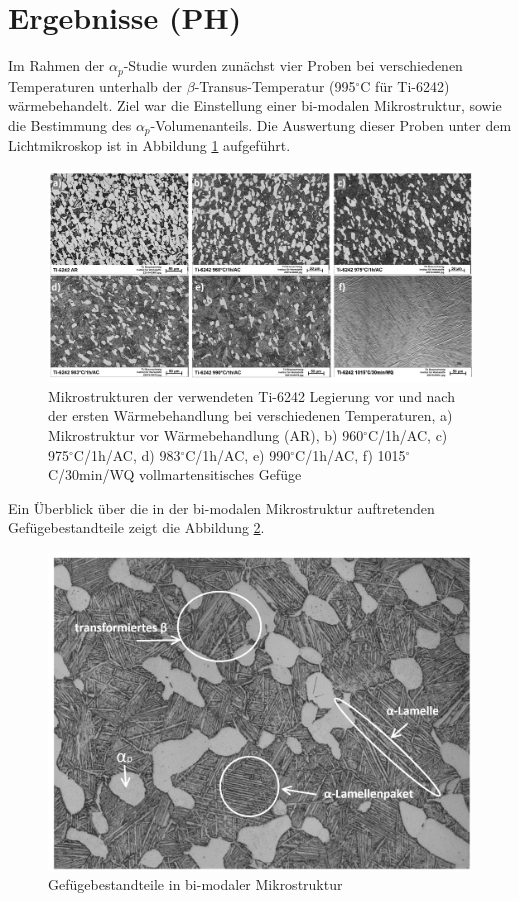 \section{Ergebnisse (PH)}

Im Rahmen der $\alpha_p$-Studie wurden zunächst vier Proben bei verschiedenen Temperaturen unterhalb der $\beta$-Transus-Temperatur (995$^\circ$C für Ti-6242) wärmebehandelt. Ziel war die Einstellung einer bi-modalen Mikrostruktur, sowie die Bestimmung des $\alpha_p$-Volumenanteils. Die Auswertung dieser Proben unter dem Lichtmikroskop ist in Abbildung \ref{fig:abbildung-8} aufgeführt. 

\begin{figure}[h]
	\centering
	\includegraphics[width=1.0\linewidth]{./Bilder/Abbildung 8.png}
	\caption[Abbildung 8]{Mikrostrukturen der verwendeten Ti-6242 Legierung vor und nach der ersten Wärmebehandlung bei verschiedenen Temperaturen, a) Mikrostruktur vor Wärmebehandlung (AR), b) 960$^\circ$C/1h/AC, c) 975$^\circ$C/1h/AC, d) 983$^\circ$C/1h/AC, e) 990$^\circ$C/1h/AC, f) 1015$^\circ$C/30min/WQ vollmartensitisches Gefüge}
	\label{fig:abbildung-8}
\end{figure}

Ein Überblick über die in der bi-modalen Mikrostruktur auftretenden Gefügebestandteile zeigt die Abbildung \ref{fig:abbildung-20}.

\begin{figure}[h]
	\centering
	\includegraphics[width=0.6\linewidth]{./Bilder/Abbildung 20.png}
	\caption[Abbildung 20]{Gefügebestandteile in bi-modaler Mikrostruktur}
	\label{fig:abbildung-20}
\end{figure}

